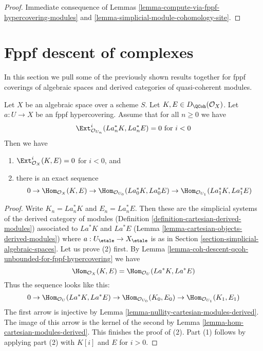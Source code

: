 \begin{proof}
Immediate consequence of
Lemmas \ref{lemma-compute-via-fppf-hypercovering-modules}
and \ref{lemma-simplicial-module-cohomology-site}.
\end{proof}







\section{Fppf descent of complexes}
\label{section-fppf-descent-derived}

\noindent
In this section we pull some of the previously shown
results together for fppf coverings of algebraic spaces
and derived categories of quasi-coherent modules.

\begin{lemma}
\label{lemma-fppf-neg-ext-zero-hom}
Let $X$ be an algebraic space over a scheme $S$.
Let $K, E \in D_\QCoh(\mathcal{O}_X)$.
Let $a : U \to X$ be an fppf hypercovering.
Assume that for all $n \geq 0$ we have
$$
\Ext_{\mathcal{O}_{U_n}}^i(La_n^*K, La_n^*E) = 0
\text{ for } i < 0
$$
Then we have
\begin{enumerate}
\item $\Ext_{\mathcal{O}_X}^i(K, E) = 0$ for $i < 0$, and
\item there is an exact sequence
$$
0
\to
\Hom_{\mathcal{O}_X}(K, E)
\to
\Hom_{\mathcal{O}_{U_0}}(La_0^*K, La_0^*E)
\to
\Hom_{\mathcal{O}_{U_1}}(La_1^*K, La_1^*E)
$$
\end{enumerate}
\end{lemma}

\begin{proof}
Write $K_n = La_n^*K$ and $E_n = La_n^*E$. Then these are the
simplicial systems of the derived category of modules
(Definition \ref{definition-cartesian-derived-modules})
associated to $La^*K$ and $La^*E$
(Lemma \ref{lemma-cartesian-objects-derived-modules})
where $a : U_\etale \to X_\etale$ is as in
Section \ref{section-simplicial-algebraic-spaces}.
Let us prove (2) first. By
Lemma \ref{lemma-coh-descent-qcoh-unbounded-for-fppf-hypercovering}
we have
$$
\Hom_{\mathcal{O}_X}(K, E) =
\Hom_{\mathcal{O}_U}(La^*K, La^*E)
$$
Thus the sequence looks like this:
$$
0
\to
\Hom_{\mathcal{O}_U}(La^*K, La^*E)
\to
\Hom_{\mathcal{O}_{U_0}}(K_0, E_0)
\to
\Hom_{\mathcal{O}_{U_1}}(K_1, E_1)
$$
The first arrow  is injective by
Lemma \ref{lemma-nullity-cartesian-modules-derived}.
The image of this arrow is the kernel of the second
by Lemma \ref{lemma-hom-cartesian-modules-derived}.
This finishes the proof of (2).
Part (1) follows by applying part (2) with
$K[i]$ and $E$ for $i > 0$.
\end{proof}

